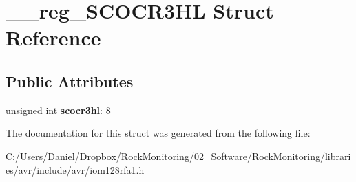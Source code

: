\hypertarget{struct____reg___s_c_o_c_r3_h_l}{}\section{\+\_\+\+\_\+reg\+\_\+\+S\+C\+O\+C\+R3\+HL Struct Reference}
\label{struct____reg___s_c_o_c_r3_h_l}
\subsection*{Public Attributes}
\begin{DoxyCompactItemize}
\item 
unsigned int {\bfseries scocr3hl}\+: 8\hypertarget{struct____reg___s_c_o_c_r3_h_l_af38e6ff3ab1481b24058b6258621521e}{}\label{struct____reg___s_c_o_c_r3_h_l_af38e6ff3ab1481b24058b6258621521e}

\end{DoxyCompactItemize}


The documentation for this struct was generated from the following file\+:\begin{DoxyCompactItemize}
\item 
C\+:/\+Users/\+Daniel/\+Dropbox/\+Rock\+Monitoring/02\+\_\+\+Software/\+Rock\+Monitoring/libraries/avr/include/avr/iom128rfa1.\+h\end{DoxyCompactItemize}
